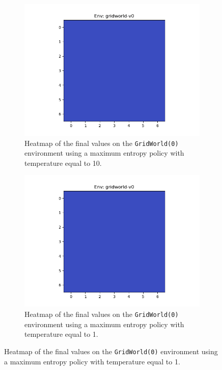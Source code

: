 \documentclass{article}
\begin{document}
\begin{enumerate}[(a)]
\begin{figure}[h!]
    \centering
    \begin{subfigure}{0.3\textwidth}
        \centering
        \includegraphics[width=\textwidth]{../figures/gridworld-v0_maxent_t0.png}
        \caption{Heatmap of the final values on the \texttt{GridWorld(0)} environment using a maximum entropy policy with temperature equal to 10.}
    \end{subfigure}
    \hspace{0.1 in}
    \begin{subfigure}{0.3\textwidth}
        \centering
        \includegraphics[width=\textwidth]{../figures/gridworld-v0_maxent_t1.png}
        \caption{Heatmap of the final values on the \texttt{GridWorld(0)} environment using a maximum entropy policy with temperature equal to 1.}

\end{subfigure}
\end{figure}
\end{enumerate}
\end{document}

